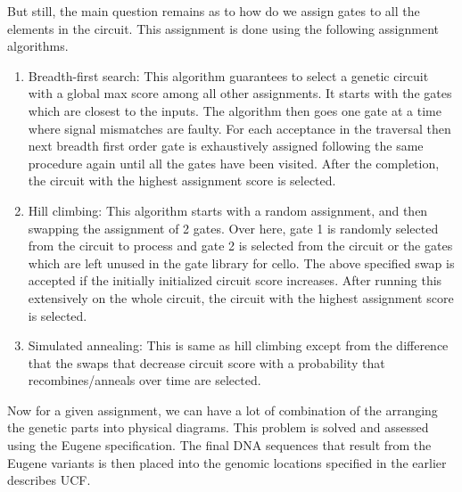 \documentclass[11pt]{article}
\begin{document}
But still, the main question remains as to how do we assign gates to all the elements in the circuit. This assignment is done using the following assignment algorithms.
\begin{enumerate}
\item Breadth-first search: 
This algorithm guarantees to select a genetic circuit with  a global max score among all other assignments. It starts with the gates which are closest to the inputs. The algorithm then goes one gate at a time where signal mismatches are faulty. For each acceptance in the traversal then next breadth first order gate is exhaustively assigned following the same procedure again until all the gates have been visited. After the completion, the circuit with the highest assignment score is selected.  \cite{Cidarlab}
\item Hill climbing: 
This algorithm starts with a random assignment, and then swapping the assignment of 2 gates. Over here, gate 1 is randomly selected from the circuit to process and gate 2 is selected from the circuit or the gates which are left unused in the gate library for cello. The above specified swap is accepted if the initially initialized circuit score increases. After running this extensively on the whole circuit, the circuit with the highest assignment score is selected.\cite{Cidarlab}
\item Simulated annealing: 
This is same as hill climbing except from the difference that the swaps that decrease circuit score with a probability that recombines/anneals over time are selected.\cite{Cidarlab}
\end{enumerate}
Now for a given assignment, we can have a lot of combination of the arranging the genetic parts into physical diagrams. This problem is solved and assessed using the Eugene specification. The final DNA sequences that result from the Eugene variants is then placed into the genomic locations specified in the earlier describes UCF.   
\end{document}
